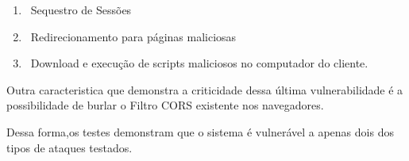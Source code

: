 \documentclass[
    12pt,               %
    openright,          %
    oneside,            %
    a4paper,            %
    section=TITLE,     %
    english,            %
    french,             %
    spanish,            %
    brazil              %
    ]{abntex2}
\begin{document}
\begin{enumerate}[start=1]
	
\item ~Sequestro de Sessões
	
\item ~Redirecionamento para páginas maliciosas
	
\item ~Download e execução de scripts maliciosos no computador do cliente.

\end{enumerate}

Outra caracteristica que demonstra a criticidade dessa última vulnerabilidade é a possibilidade de burlar o Filtro CORS existente nos navegadores.


Dessa forma,os testes demonstram que o sistema é vulnerável a apenas dois dos tipos de ataques testados.

















\postextual






%
%








\printindex
\end{document}
